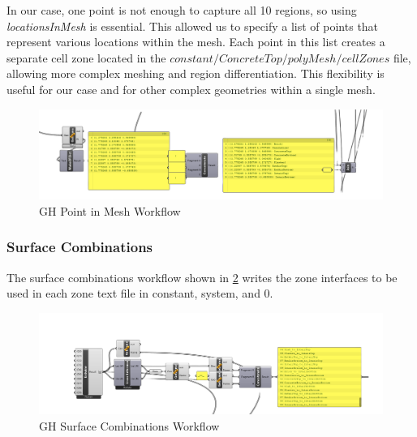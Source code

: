 In our case, one point is not enough to capture all 10 regions, so using \textit{locationsInMesh} is essential. This allowed us to specify a list of points that represent various locations within the mesh. Each point in this list creates a separate cell zone located in the $constant/ConcreteTop/polyMesh/cellZones$ file, allowing more complex meshing and region differentiation. This flexibility is useful for our case and for other complex geometries within a single mesh.

\begin{figure}[tbh]
\centering
\includegraphics[width=0.77\columnwidth]{Figures/locinmeshgh.png}
\hspace{0.7cm}
\caption{\gls{GH} Point in Mesh Workflow}
\label{locgh}
\end{figure}








\subsubsection{Surface Combinations}
The surface combinations workflow shown in \ref{surfgh} writes the zone interfaces to be used in each zone text file in constant, system, and 0. 

\begin{figure}[tbh]
\centering
\includegraphics[width=0.77\columnwidth]{Figures/file (8).png}
\hspace{0.7cm}
\caption{\gls{GH} Surface Combinations Workflow}
\label{surfgh}
\end{figure}



